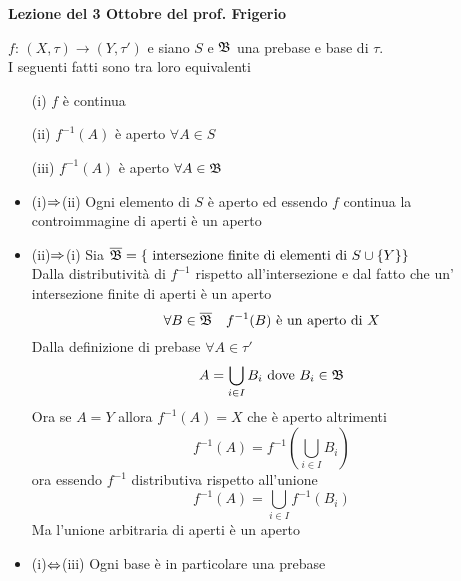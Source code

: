 

\textbf{Lezione del 3 Ottobre del prof. Frigerio}

\begin{prop}$f:\, (X,\tau)\to (Y,\tau')$ e siano $S$ e $\mathfrak{B}$ una prebase e base di $\tau$.\\
I seguenti fatti sono tra loro equivalenti
\begin{itemize}
\item[(i)]$f$ \`e continua
\item[(ii)]$f^{-1}(A) $ \`e aperto $\forall A \in S$
\item[(iii)]$f^{-1}(A)$ \`e aperto $\forall A \in \mathfrak{B}$
\end{itemize}
\proof \bbianco
\begin{itemize}
\item (i)$\Rightarrow$(ii) Ogni elemento di $S$ \`e aperto ed essendo $f$ continua la controimmagine di aperti \`e un aperto 
\item (ii)$\Rightarrow$(i) Sia $\overline{\mathfrak{B}}=\{ \text{ intersezione finite di elementi di } S \cup \{ Y \} \} $\\
Dalla distributivit\`a di $f^{-1}$ rispetto all'intersezione e dal fatto che un' intersezione finite di aperti \`e un aperto 
$$ \forall B \in \overline{\mathfrak{B}} \quad f^{-1}(B)\text{ \`e un aperto di } X $$
Dalla definizione di prebase $\forall A \in \tau'$ 
$$ A = \bigcup_{i\in I } B_i \text{ dove } B_i \in \mathfrak{B} $$ 
Ora se $A=Y$ allora $f^{-1}(A)=X$ che \`e aperto altrimenti 
$$f^{-1}(A)= f^{-1} \left( \bigcup_{i \in I } B_i \right)$$ 
ora essendo $f^{-1}$ distributiva rispetto all'unione 
$$ f^{-1}(A)= \bigcup_{i \in I} f^{-1}(B_i)$$
Ma l'unione arbitraria di aperti \`e un aperto 
\item (i)$\Leftrightarrow$(iii)  Ogni base \`e in particolare una prebase
\end{itemize}
\endproof
\end{prop}

\newpage

